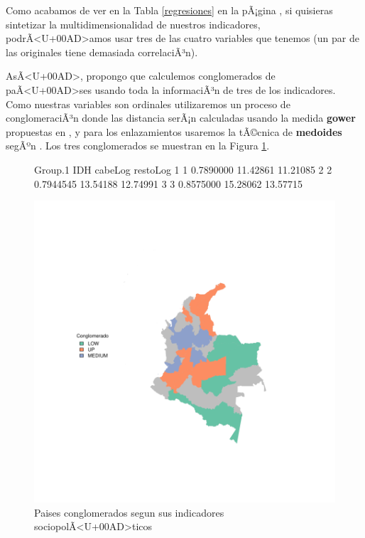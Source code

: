 \documentclass{article}
\begin{document}
Como acabamos de ver en la Tabla \ref{regresiones} en la pÃ¡gina \pageref{regresiones}, si quisieras sintetizar la multidimensionalidad de nuestros indicadores, podrÃ<U+00AD>amos usar tres de las cuatro variables que tenemos (un par de las originales tiene demasiada correlaciÃ³n). 

AsÃ<U+00AD>, propongo que calculemos conglomerados de paÃ<U+00AD>ses usando toda la informaciÃ³n de tres de los indicadores. Como nuestras variables son ordinales utilizaremos un proceso de conglomeraciÃ³n donde las distancia serÃ¡n calculadas usando la medida {\bf gower} propuestas en \cite{gower_general_1971}, y para los enlazamientos usaremos la tÃ©cnica de {\bf medoides} segÃºn \cite{reynolds_clustering_2006}. Los tres conglomerados se muestran en la Figura \ref{clustmap}.






\begin{figure}[h]
\centering
\begin{Schunk}
\begin{Soutput}
  Group.1       IDH  cabeLog restoLog
1       1 0.7890000 11.42861 11.21085
2       2 0.7944545 13.54188 12.74991
3       3 0.8575000 15.28062 13.57715
\end{Soutput}
\end{Schunk}
\includegraphics{Preliminar-plotMap1}

\caption{Paises conglomerados segun sus indicadores sociopolÃ<U+00AD>ticos}\label{clustmap}
\end{figure}






\renewcommand{\refname}{Bibliografia}

\end{document}
